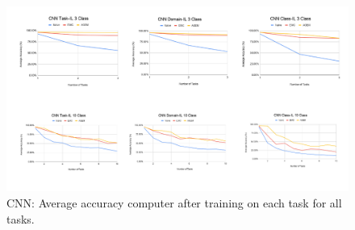 \documentclass{article}
\begin{document}
\begin{figure}[h]
	\centering
    \includegraphics[width=1\linewidth]{res_2}
    \caption{CNN: Average accuracy computer after training on each task for all tasks.}
	\label{fig:res_2}
\end{figure}
\end{document}

